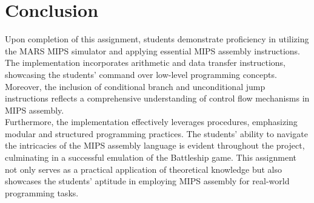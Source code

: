 \section{Conclusion}
\qquad Upon completion of this assignment, students demonstrate proficiency in utilizing the MARS MIPS simulator and applying essential MIPS assembly instructions. The implementation incorporates arithmetic and data transfer instructions, showcasing the students' command over low-level programming concepts. Moreover, the inclusion of conditional branch and unconditional jump instructions reflects a comprehensive understanding of control flow mechanisms in MIPS assembly.\\

\qquad Furthermore, the implementation effectively leverages procedures, emphasizing modular and structured programming practices. The students' ability to navigate the intricacies of the MIPS assembly language is evident throughout the project, culminating in a successful emulation of the Battleship game. This assignment not only serves as a practical application of theoretical knowledge but also showcases the students' aptitude in employing MIPS assembly for real-world programming tasks.